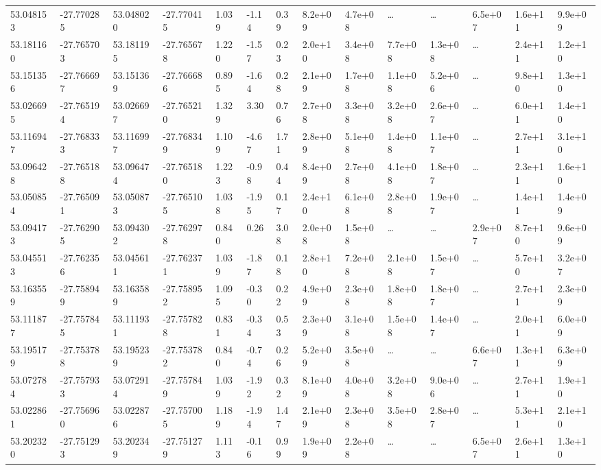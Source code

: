 \documentclass[referee]{aa}
\begin{document}
{\begin{landscape}
\begin{longtable}{llllllllllllll}
53.048153 & -27.770285 & 53.048020 & -27.770415 & 1.039 & -1.14 & 0.39 & 8.2e+09 & 4.7e+08 & \ldots & \ldots & 6.5e+07 & 1.6e+11 & 9.9e+09  \\
53.181160 & -27.765703 & 53.181195 & -27.765678 & 1.220 & -1.57 & 0.23 & 2.0e+10 & 3.4e+08 & 7.7e+08 & 1.3e+08 & \ldots & 2.4e+11 & 1.2e+10  \\
53.151356 & -27.766697 & 53.151369 & -27.766686 & 0.895 & -1.64 & 0.28 & 2.1e+09 & 1.7e+08 & 1.1e+08 & 5.2e+06 & \ldots & 9.8e+10 & 1.3e+10  \\
53.026695 & -27.765194 & 53.026697 & -27.765210 & 1.329 & 3.30 & 0.76 & 2.7e+08 & 3.3e+08 & 3.2e+08 & 2.6e+07 & \ldots & 6.0e+11 & 1.4e+10  \\
53.116947 & -27.768333 & 53.116997 & -27.768349 & 1.109 & -4.67 & 1.71 & 2.8e+09 & 5.1e+08 & 1.4e+08 & 1.1e+07 & \ldots & 2.7e+11 & 3.1e+10  \\
53.096428 & -27.765188 & 53.096474 & -27.765180 & 1.223 & -0.98 & 0.44 & 8.4e+09 & 2.7e+08 & 4.1e+08 & 1.8e+07 & \ldots & 2.3e+11 & 1.6e+10  \\
53.050854 & -27.765091 & 53.050873 & -27.765105 & 1.038 & -1.95 & 0.17 & 2.4e+10 & 6.1e+08 & 2.8e+08 & 1.9e+07 & \ldots & 1.4e+11 & 1.4e+09  \\
53.094173 & -27.762905 & 53.094302 & -27.762978 & 0.840 & 0.26 & 3.08 & 2.0e+08 & 1.5e+08 & \ldots & \ldots & 2.9e+07 & 8.7e+10 & 9.6e+09  \\
53.045513 & -27.762356 & 53.045611 & -27.762371 & 1.039 & -1.87 & 0.18 & 2.8e+10 & 7.2e+08 & 2.1e+08 & 1.5e+07 & \ldots & 5.7e+10 & 3.2e+07  \\
53.163559 & -27.758949 & 53.163589 & -27.758952 & 1.095 & -0.30 & 0.22 & 4.9e+09 & 2.3e+08 & 1.8e+08 & 1.8e+07 & \ldots & 2.7e+11 & 2.3e+09  \\
53.111877 & -27.757845 & 53.111931 & -27.757828 & 0.831 & -0.34 & 0.53 & 2.3e+09 & 3.1e+08 & 1.5e+08 & 1.4e+07 & \ldots & 2.0e+11 & 6.0e+09  \\
53.195179 & -27.753788 & 53.195239 & -27.753782 & 0.840 & -0.74 & 0.26 & 5.2e+09 & 3.5e+08 & \ldots & \ldots & 6.6e+07 & 1.3e+11 & 6.3e+09  \\
53.072784 & -27.757933 & 53.072914 & -27.757849 & 1.039 & -1.92 & 0.32 & 8.1e+09 & 4.0e+08 & 3.2e+08 & 9.0e+06 & \ldots & 2.7e+11 & 1.9e+10  \\
53.022861 & -27.756960 & 53.022876 & -27.757005 & 1.189 & -1.94 & 1.47 & 2.1e+09 & 2.3e+08 & 3.5e+08 & 2.8e+07 & \ldots & 5.3e+11 & 2.1e+10  \\
53.202320 & -27.751293 & 53.202349 & -27.751279 & 1.113 & -0.16 & 0.99 & 1.9e+09 & 2.2e+08 & \ldots & \ldots & 6.5e+07 & 2.6e+11 & 1.3e+10  \\

\end{longtable}
\end{landscape}}
\end{document}
